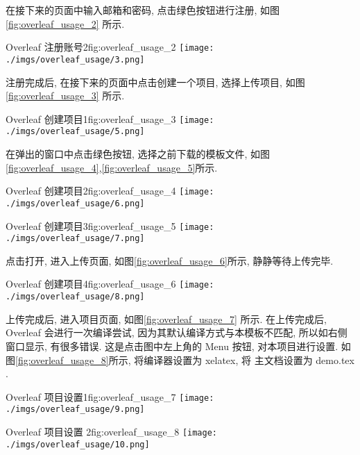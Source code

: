 \documentclass[bibsec, master, figtoc, tabtoc]{cugthesis}
\begin{document}
在接下来的页面中输入邮箱和密码, 点击绿色按钮进行注册,
如图\ref{fig:overleaf_usage_2} 所示.

\begin{tfig}{Overleaf 注册账号2}{fig:overleaf_usage_2}
\texttt{[image: ./imgs/overleaf\_usage/3.png]}
\end{tfig}

注册完成后, 在接下来的页面中点击创建一个项目, 选择上传项目,
如图\ref{fig:overleaf_usage_3} 所示.

\begin{tfig}{Overleaf  创建项目1}{fig:overleaf_usage_3}
\texttt{[image: ./imgs/overleaf\_usage/5.png]}
\end{tfig}

在弹出的窗口中点击绿色按钮, 选择之前下载的模板文件,
如图\ref{fig:overleaf_usage_4},\ref{fig:overleaf_usage_5}所示.

\begin{tfig}{Overleaf  创建项目2}{fig:overleaf_usage_4}
\texttt{[image: ./imgs/overleaf\_usage/6.png]}
\end{tfig}

\begin{tfig}{Overleaf  创建项目3}{fig:overleaf_usage_5}
\texttt{[image: ./imgs/overleaf\_usage/7.png]}
\end{tfig}

点击打开, 进入上传页面, 如图\ref{fig:overleaf_usage_6}所示, 静静等待上传完毕.

\begin{tfig}{Overleaf  创建项目4}{fig:overleaf_usage_6}
\texttt{[image: ./imgs/overleaf\_usage/8.png]}
\end{tfig}

上传完成后, 进入项目页面, 如图\ref{fig:overleaf_usage_7} 所示. 在上传完成后,
Overleaf 会进行一次编译尝试, 因为其默认编译方式与本模板不匹配,
所以如右侧窗口显示, 有很多错误. 这是点击图中左上角的 Menu 按钮,
对本项目进行设置. 如图\ref{fig:overleaf_usage_8}所示, 将编译器设置为 xelatex, 将
主文档设置为 demo.tex .

\begin{tfig}{Overleaf   项目设置1}{fig:overleaf_usage_7}
\texttt{[image: ./imgs/overleaf\_usage/9.png]}
\end{tfig}

\begin{tfig}{Overleaf  项目设置 2}{fig:overleaf_usage_8}
\texttt{[image: ./imgs/overleaf\_usage/10.png]}
\end{tfig}
\end{document}
